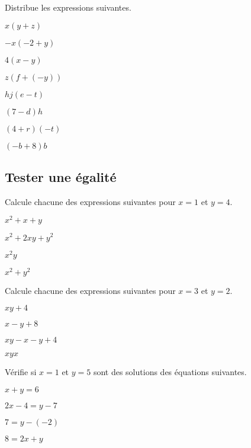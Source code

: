\begin{exercice}
    Distribue les expressions suivantes.
    \begin{exerciceenum}
        \item $x(y + z)$
        \item $-x(-2+y)$
        \item $4(x - y)$
        \item $z(f + (-y))$
        \item $hj(e - t)$
        \item $(7 - d) h$
        \item $(4 + r) (-t)$
        \item $(- b+ 8) b$
    \end{exerciceenum}
\end{exercice}

\subsection{Tester une égalité}

\begin{exercice}
    Calcule chacune des expressions suivantes pour $x=1$ et $y=4$.
    \begin{exerciceenum}
        \item $x^2+x+y$
        \item $x^2+2xy+y^2$
        \item $x^2y$
        \item $x^2+y^2$
    \end{exerciceenum}

    Calcule chacune des expressions suivantes pour $x=3$ et $y=2$.
    \begin{exerciceenum}
        \item $xy+4$
        \item $x-y+8$
        \item $xy-x-y+4$
        \item $xyx$
    \end{exerciceenum}
\end{exercice}

\begin{exercice}
    Vérifie si $x = 1$ et $y= 5$ sont des solutions des équations suivantes.
    \begin{exerciceenumnoeq}
        \item $x + y = 6$
        \item $2x - 4 = y - 7$
        \item $7 = y - (-2)$
        \item $8 = 2x + y$
    \end{exerciceenumnoeq}
\end{exercice}

